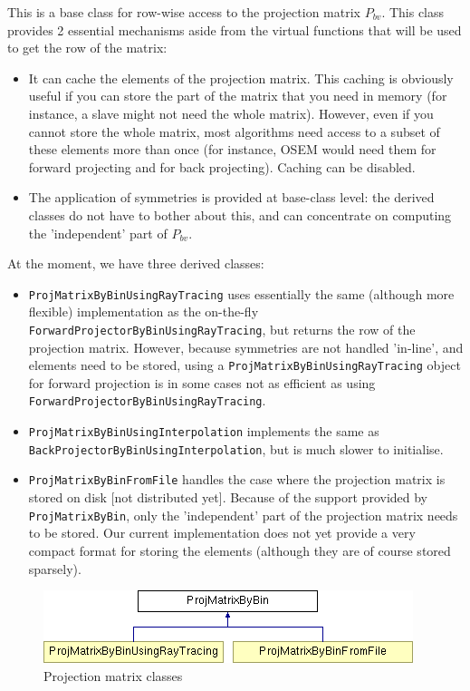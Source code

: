 \documentclass{article}
\begin{document}
This is a base class for row-wise access to the projection matrix $P_{bv}$. 
This class provides 2 essential mechanisms aside from the virtual 
functions that will be used to get the row of the matrix:
\begin{itemize}
\item 
It can cache the elements of the projection matrix. This caching 
is obviously useful if you can store the part of the matrix that 
you need in memory (for instance, a slave might not need the 
whole matrix). However, even if you cannot store the whole matrix, 
most algorithms need access to a subset of these elements more 
than once (for instance, OSEM would need them for forward projecting 
and for back projecting). Caching can be disabled.
\item 
The application of symmetries is provided at base-class level: 
the derived classes do not have to bother about this, and can 
concentrate on computing the 'independent' part of $P_{bv}$. 
\end{itemize}


At the moment, we have three derived classes:
\begin{itemize}
\item 
\texttt{ProjMatrixByBinUsingRayTracing} uses essentially the same 
(although more flexible) implementation as the on-the-fly \texttt{ForwardProjectorByBinUsingRayTracing}, but 
returns the row of the projection matrix. However, because symmetries 
are not handled 'in-line', and elements need to be stored, using 
a \texttt{ProjMatrixByBinUsingRayTracing} object for forward projection 
is in some cases not as efficient as using \texttt{ForwardProjectorByBinUsingRayTracing}.
\item
\texttt{ProjMatrixByBinUsingInterpolation} implements the same as
\texttt{BackProjectorByBinUsingInterpolation}, but is much slower to initialise.
\item 
\texttt{ProjMatrixByBinFromFile} handles the case where the projection 
matrix is stored on disk [not distributed yet]. Because of the 
support provided by \texttt{ProjMatrixByBin}, only the 'independent' 
part of the projection matrix needs to be stored. Our current 
implementation does not yet provide a very compact format for 
storing the elements (although they are of course stored sparsely).
\end{itemize}

\begin{figure}[htbp]
\begin{center}
\includegraphics[bb = 0 0 407 79, scale=0.52]{graphics/STIR-developers-overviewFig12}
\caption{Projection matrix classes}
\end{center}
\end{figure}
\end{document}

